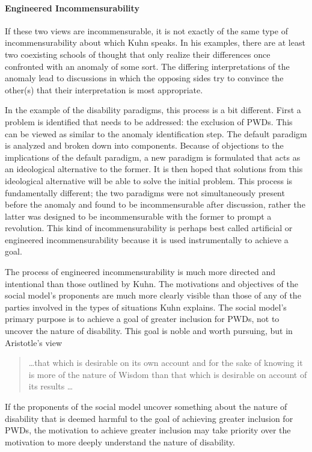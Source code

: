 \documentclass[a4paper]{article}
\begin{document}
\paragraph{Engineered Incommensurability}

If these two views are incommensurable, it is not exactly of the same type of
incommensurability about which Kuhn speaks. In his examples, there are at
least two coexisting schools of thought that only realize their differences
once confronted with an anomaly of some sort. The differing interpretations of
the anomaly lead to discussions in which the opposing sides try to convince
the other(s) that their interpretation is most appropriate.

In the example of the disability paradigms, this process is a bit different.
First a problem is identified that needs to be addressed: the exclusion of
PWDs. This can be viewed as similar to the anomaly identification step. The
default paradigm is analyzed and broken down into components. Because of
objections to the implications of the default paradigm, a new paradigm is
formulated that acts as an ideological alternative to the former. It is then
hoped that solutions from this ideological alternative will be able to solve
the initial problem. This process is fundamentally different; the two
paradigms were not simultaneously present before the anomaly and found to be
incommensurable after discussion, rather the latter was designed to be
incommensurable with the former to prompt a revolution. This kind of
incommensurability is perhaps best called artificial or engineered
incommensurability because it is used instrumentally to achieve a goal.

The process of engineered incommensurability is much more directed and
intentional than those outlined by Kuhn. The motivations and objectives of the
social model's proponents are much more clearly visible than those of any of
the parties involved in the types of situations Kuhn explains. The social
model's primary purpose is to achieve a goal of greater inclusion for PWDs,
not to uncover the nature of disability. This goal is noble and worth
pursuing, but in Aristotle's view
%
\begin{quote}
    \ldots that which is desirable on its own account and for the sake of
    knowing it is more of the nature of Wisdom than that which is desirable on
    account of its results \ldots
\end{quote}
%
If the proponents of the social model uncover something about the nature of
disability that is deemed harmful to the goal of achieving greater inclusion
for PWDs, the motivation to achieve greater inclusion may take priority over
the motivation to more deeply understand the nature of disability.
\end{document}
